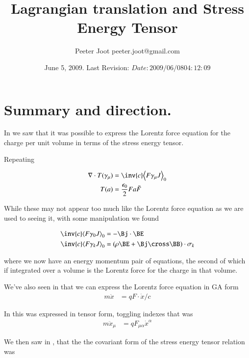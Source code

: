 \documentclass{article}
\title{Lagrangian translation and Stress Energy Tensor}\label{chap:stress_energy_noethers}
\author{Peeter Joot \quad peeter.joot@gmail.com }
\date{ June 5, 2009.  Last Revision: $Date: 2009/06/08 04:12:09 $ }
\begin{document}
\maketitle{}
\tableofcontents
\section{ Summary and direction. }

In 
\cite{PJstressEnergyLorentz} 
we saw that it was
possible to express the Lorentz force equation for the charge per unit
volume in terms of the stress energy tensor.

Repeating 

\begin{align}
\grad \cdot T(\gamma_\mu) &= \inv{c} \gpgradezero{ F \gamma_\mu J } \\
T(a) &= \frac{\epsilon_0}{2} F a \tilde{F}
\end{align}

While these
may not appear too much like the Lorentz force equation as we are used
to seeing it, with some manipulation we found 

\begin{align}
\inv{c} \gpgradezero{ F \gamma_0 J } &= -\Bj \cdot \BE \\
\inv{c} \gpgradezero{ F \gamma_k J } &= (\rho \BE + \Bj \cross \BB) \cdot \sigma_k
\end{align}

where we now have an energy momentum pair of equations, the second
of which if integrated over a volume is the Lorentz force for the charge
in that volume.

We've also seen in
that we can express the Lorentz force equation in GA form
\begin{align}
m \ddot{x} &= q F \cdot \dot{x}/c
\end{align}

In 
this was expressed in tensor form, toggling indexes that was
\begin{align}
m \ddot{x}_\mu &= {q} F_{\mu\alpha} \dot{x}^\alpha
\end{align}

We then saw in
\cite{PJenMtensor}
, that the
the covariant form of the stress energy tensor relation was
\end{document}
